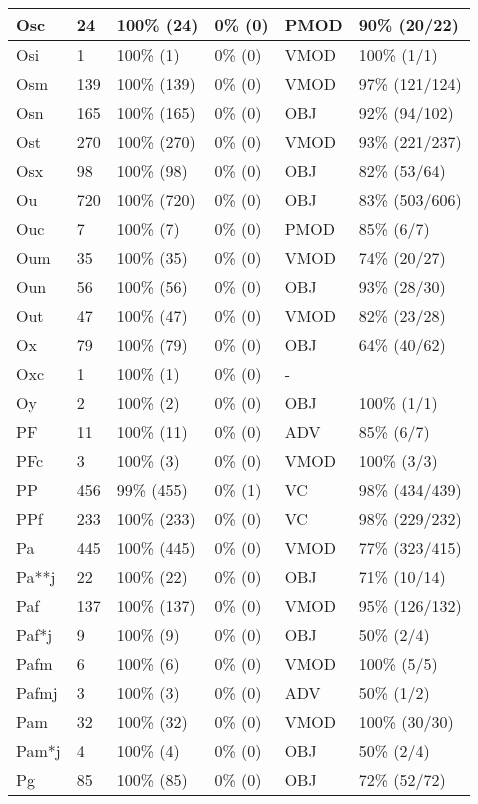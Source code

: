 \begin{figure*}
\begin{tabular}{|l|l|l|l||l|l|}
\hline
 Osc & 24 & 100\% (24) & 0\% (0) & PMOD & 90\% (20/22) \\ 
\hline
 Osi & 1 & 100\% (1) & 0\% (0) & VMOD & 100\% (1/1) \\ 
\hline
 Osm & 139 & 100\% (139) & 0\% (0) & VMOD & 97\% (121/124) \\ 
\hline
 Osn & 165 & 100\% (165) & 0\% (0) & OBJ & 92\% (94/102) \\ 
\hline
 Ost & 270 & 100\% (270) & 0\% (0) & VMOD & 93\% (221/237) \\ 
\hline
 Osx & 98 & 100\% (98) & 0\% (0) & OBJ & 82\% (53/64) \\ 
\hline
 Ou & 720 & 100\% (720) & 0\% (0) & OBJ & 83\% (503/606) \\ 
\hline
 Ouc & 7 & 100\% (7) & 0\% (0) & PMOD & 85\% (6/7) \\ 
\hline
 Oum & 35 & 100\% (35) & 0\% (0) & VMOD & 74\% (20/27) \\ 
\hline
 Oun & 56 & 100\% (56) & 0\% (0) & OBJ & 93\% (28/30) \\ 
\hline
 Out & 47 & 100\% (47) & 0\% (0) & VMOD & 82\% (23/28) \\ 
\hline
 Ox & 79 & 100\% (79) & 0\% (0) & OBJ & 64\% (40/62) \\ 
\hline
 Oxc & 1 & 100\% (1) & 0\% (0) & - &  \\ 
\hline
 Oy & 2 & 100\% (2) & 0\% (0) & OBJ & 100\% (1/1) \\ 
\hline
 PF & 11 & 100\% (11) & 0\% (0) & ADV & 85\% (6/7) \\ 
\hline
 PFc & 3 & 100\% (3) & 0\% (0) & VMOD & 100\% (3/3) \\ 
\hline
 PP & 456 & 99\% (455) & 0\% (1) & VC & 98\% (434/439) \\ 
\hline
 PPf & 233 & 100\% (233) & 0\% (0) & VC & 98\% (229/232) \\ 
\hline
 Pa & 445 & 100\% (445) & 0\% (0) & VMOD & 77\% (323/415) \\ 
\hline
 Pa**j & 22 & 100\% (22) & 0\% (0) & OBJ & 71\% (10/14) \\ 
\hline
 Paf & 137 & 100\% (137) & 0\% (0) & VMOD & 95\% (126/132) \\ 
\hline
 Paf*j & 9 & 100\% (9) & 0\% (0) & OBJ & 50\% (2/4) \\ 
\hline
 Pafm & 6 & 100\% (6) & 0\% (0) & VMOD & 100\% (5/5) \\ 
\hline
 Pafmj & 3 & 100\% (3) & 0\% (0) & ADV & 50\% (1/2) \\ 
\hline
 Pam & 32 & 100\% (32) & 0\% (0) & VMOD & 100\% (30/30) \\ 
\hline
 Pam*j & 4 & 100\% (4) & 0\% (0) & OBJ & 50\% (2/4) \\ 
\hline
 Pg & 85 & 100\% (85) & 0\% (0) & OBJ & 72\% (52/72) \\ 
\hline
\end{tabular}
\end{figure*}
